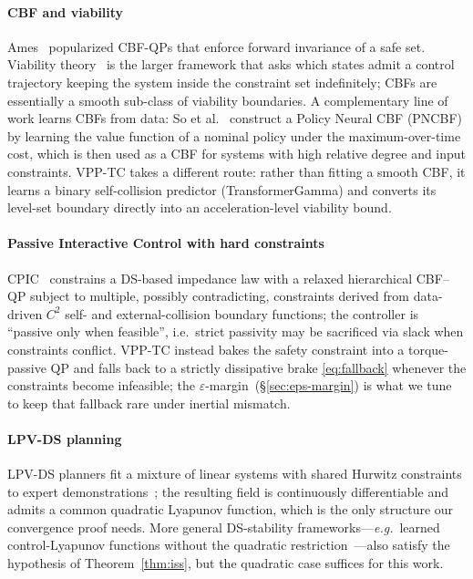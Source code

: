 \documentclass[10pt,conference]{IEEEtran}
\theoremstyle{remark}
\theoremstyle{plain}
\begin{document}
\paragraph*{CBF and viability}  Ames~\cite{ames2019cbf} popularized
CBF-QPs that enforce forward invariance of a safe set. Viability
theory~\cite{aubin1991viability} is the larger framework that asks
which states admit a control trajectory keeping the system inside
the constraint set indefinitely; CBFs are essentially a smooth
sub-class of viability boundaries. A complementary line of work
learns CBFs from data: So et al.~\cite{so2024neuralcbf} construct
a Policy Neural CBF (PNCBF) by learning the value function of a
nominal policy under the maximum-over-time cost, which is then
used as a CBF for systems with high relative degree and input
constraints. VPP-TC takes a different route: rather than fitting a
smooth CBF, it learns a binary self-collision predictor
(TransformerGamma) and converts its level-set boundary directly
into an acceleration-level viability bound.

\paragraph*{Passive Interactive Control with hard constraints}
CPIC~\cite{zhang2024cpic} constrains a DS-based impedance law with
a relaxed hierarchical CBF--QP subject to multiple, possibly
contradicting, constraints derived from data-driven $C^2$
self- and external-collision boundary functions; the controller is
``passive only when feasible'', i.e.\ strict passivity may be
sacrificed via slack when constraints conflict. VPP-TC instead
bakes the safety constraint into a torque-passive QP and falls
back to a strictly dissipative brake \eqref{eq:fallback} whenever
the constraints become infeasible; the
$\varepsilon$-margin~(\S\ref{sec:eps-margin}) is what we tune to
keep that fallback rare under inertial mismatch.

\paragraph*{LPV-DS planning}  LPV-DS planners fit a mixture of
linear systems with shared Hurwitz constraints to expert
demonstrations~\cite{figueroa2018lpvds}; the resulting field is
continuously differentiable and admits a common quadratic
Lyapunov function, which is the only structure our convergence
proof needs. More general DS-stability frameworks---\emph{e.g.}\
learned control-Lyapunov functions without the quadratic
restriction~\cite{khansari2014clf}---also satisfy the hypothesis
of Theorem~\ref{thm:iss}, but the quadratic case suffices for
this work.
\end{document}
